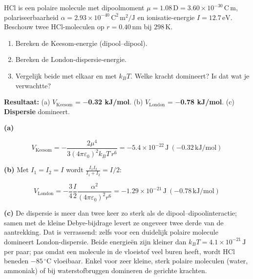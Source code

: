 \begin{oefening}
HCl is een polaire molecule met dipoolmoment \(\mu = 1.08\,\mathrm{D} = 3.60\times10^{-30}\,\mathrm{C\,m}\), polariseerbaarheid \(\alpha = 2.93\times10^{-40}\,\mathrm{C^2\,m^2/J}\) en ionisatie-energie \(I = 12.7\,\mathrm{eV}\). Beschouw twee HCl-moleculen op \(r = 0.40\,\mathrm{nm}\) bij \(298\,\mathrm{K}\).

\begin{enumerate}
\item[(a)]
  Bereken de Keesom-energie (dipool--dipool).
\item[(b)]
  Bereken de London-dispersie-energie.
\item[(c)]
  Vergelijk beide met elkaar en met \(k_BT\). Welke kracht domineert? Is dat wat je verwachtte?
\end{enumerate}
\end{oefening}
\begin{oplossing}
\textbf{Resultaat:} (a) \(V_{\text{Keesom}}\) = \textbf{\ensuremath{-}0.32 kJ/mol}. (b) \(V_{\text{London}}\) = \textbf{\ensuremath{-}0.78 kJ/mol}. (c) \textbf{Dispersie} domineert.

\textbf{(a)}

\[
V_{\text{Keesom}} = -\frac{2\mu^4}{3(4\pi\varepsilon_0)^2k_BT\,r^6} = -5.4\times10^{-22}\,\mathrm{J}\ (-0.32\,\mathrm{kJ/mol})
\]

\textbf{(b)} Met \(I_1 = I_2 = I\) wordt \(\frac{I_1I_2}{I_1+I_2} = I/2\):

\[
V_{\text{London}} = -\frac{3}{4}\frac{I}{2}\frac{\alpha^2}{(4\pi\varepsilon_0)^2r^6} = -1.29\times10^{-21}\,\mathrm{J}\ (-0.78\,\mathrm{kJ/mol})
\]

\textbf{(c)} De dispersie is meer dan twee keer zo sterk als de dipool--dipoolinteractie; samen met de kleine Debye-bijdrage levert ze ongeveer twee derde van de aantrekking. Dat is verrassend: zelfs voor een duidelijk polaire molecule domineert London-dispersie. Beide energieën zijn kleiner dan \(k_BT = 4.1\times10^{-21}\,\mathrm{J}\) per paar; pas omdat een molecule in de vloeistof veel buren heeft, wordt HCl beneden \(-85\,^\circ\mathrm{C}\) vloeibaar. Enkel voor zeer kleine, sterk polaire moleculen (water, ammoniak) of bij waterstofbruggen domineren de gerichte krachten.
\end{oplossing}

